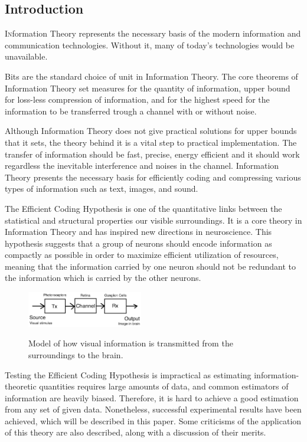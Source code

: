 \documentclass[twoside]{article}
\begin{document}
\begin{multicols}{2} %

\section{Introduction}

\lettrine[nindent=0em,lines=3]{I}nformation Theory represents the necessary basis of the modern information and communication technologies. Without it, many of today's technologies would be unavailable.

Bits are the standard choice of unit in Information Theory. The core theorems of Information Theory set measures for the quantity of information, upper bound for loss-less compression of information, and for the highest speed for the information to be transferred trough a channel with or without noise. 

Although Information Theory does not give practical solutions for upper bounds that it sets, the theory behind it is a vital step to practical implementation. The transfer of information should be fast, precise, energy efficient and it should work regardless the inevitable interference and noises in the channel. Information Theory presents the necessary basis for efficiently coding and compressing various types of information such as text, images, and sound. 

The Efficient Coding Hypothesis is one of the quantitative links between the statistical and structural properties our visible surroundings. It is a core theory in Information Theory and has inspired new directions in neuroscience. This hypothesis suggests that a group of neurons should encode information as compactly as possible in order to maximize efficient utilization of resources, meaning that the information carried by one neuron should not be redundant to the information which is carried by the other neurons. 

\begin{figure}[H]
	\caption{
		Model of how visual information is transmitted from the surroundings to the brain.
	}
	\includegraphics[width=0.45\textwidth]{model}
	\label{fig:model}
\end{figure}

Testing the Efficient Coding Hypothesis is impractical as estimating information-theoretic quantities requires large amounts of data, and common estimators of information are heavily biased. Therefore, it is hard to achieve a good estimation from any set of given data. Nonetheless, successful experimental results have been achieved, which will be described in this paper. Some criticisms of the application of this theory are also described, along with a discussion of their merits. 


\end{multicols}
\end{document}
